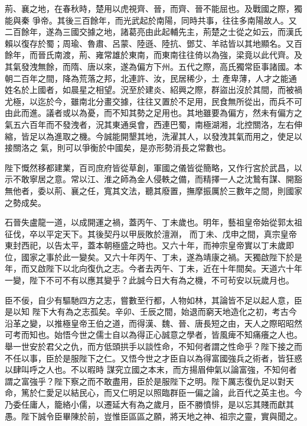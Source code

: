 \begin{pinyinscope}
 荊、襄之地，在春秋時，楚用以虎視齊、晉，而齊、晉不能屈也。及戰國之際，獨能與秦
 爭帝。其後三百餘年，而光武起於南陽，同時共事，往往多南陽故人。又二百餘年，遂為三國交據之地，諸葛亮由此起輔先主，荊楚之士從之如云，而漢氏賴以復存於蜀；周瑜、魯肅、呂蒙、陸遜、陸抗、鄧艾、羊祜皆以其地顯名。又百餘年，而晉氏南渡，荊、雍常雄於東南，而東南往往倚以為強，梁竟以此代齊。及其氣發洩無餘，而隋、唐以來，遂為偏方下州。五代之際，高氏獨常臣事諸國。本朝二百年之間，降為荒落之邦，北連許、汝，民居稀少，土
 產卑薄，人才之能通姓名於上國者，如晨星之相望。況至於建炎、紹興之際，群盜出沒於其間，而被禍尤極，以迄於今，雖南北分畫交據，往往又置於不足用，民食無所從出，而兵不可由此而進。議者或以為憂，而不知其勢之足用也。其地雖要為偏方，然未有偏方之氣五六百年而不發洩者，況其東通吳會，西連巴蜀，南極湖湘，北控關洛，左右伸縮，皆足以為進取之機。今誠能開墾其地，洗濯其人，以發洩其氣而用之，使足以接關洛之
 氣，則可以爭衡於中國矣，是亦形勢消長之常數也。



 陛下慨然移都建業，百司庶府皆從草創，軍國之儀皆從簡略，又作行宮於武昌，以示不敢寧居之意。常以江、淮之師為金人侵軼之備，而精擇一人之沈鷙有謀、開豁無他者，委以荊、襄之任，寬其文法，聽其廢置，撫摩振厲於三數年之間，則國家之勢成矣。



 石晉失盧龍一道，以成開運之禍，蓋丙午、丁未歲也。明年，藝祖皇帝始從郭太祖征伐，卒以平定天下。其後契丹以甲辰敗於澶淵，
 而丁未、戊申之間，真宗皇帝東封西祀，以告太平，蓋本朝極盛之時也。又六十年，而神宗皇帝實以丁未歲即位，國家之事於此一變矣。又六十年丙午、丁未，遂為靖康之禍。天獨啟陛下於是年，而又啟陛下以北向復仇之志。今者去丙午、丁未，近在十年間矣。天道六十年一變，陛下不可不有以應其變乎？此誠今日大有為之機，不可茍安以玩歲月也。



 臣不佞，自少有驅馳四方之志，嘗數至行都，人物如林，其論皆不足以起人意，臣是以知
 陛下大有為之志孤矣。辛卯、壬辰之間，始退而窮天地造化之初，考古今沿革之變，以推極皇帝王伯之道，而得漢、魏、晉、唐長短之由，天人之際昭昭然可考而知也。始悟今世之儒士自以為得正心誠意之學者，皆風痺不知痛癢之人也。舉一世安於君父之仇，而方低頭拱手以談性命，不知何者謂之性命乎？陛下接之而不任以事，臣於是服陛下之仁。又悟今世之才臣自以為得富國強兵之術者，皆狂惑以肆叫呼之人也。不以暇時
 謀究立國之本末，而方揚眉伸氣以論富強，不知何者謂之富強乎？陛下察之而不敢盡用，臣於是服陛下之明。陛下厲志復仇足以對天命，篤於仁愛足以結民心，而又仁明足以照臨群臣一偏之論，此百代之英主也。今乃委任庸人，籠絡小儒，以遷延大有為之歲月，臣不勝憤悱，是以忘其賤而獻其愚。陛下誠令臣畢陳於前，豈惟臣區區之願，將天地之神、祖宗之靈，實與聞之。




\end{pinyinscope}
